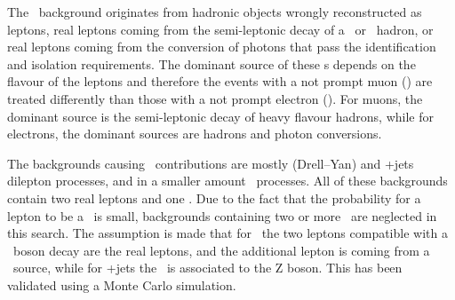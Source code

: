 The \NPL\ background originates from hadronic objects wrongly reconstructed as leptons, real leptons coming from the semi-leptonic decay of a \Pbottom\ or \Pcharm\ hadron, or real leptons coming from the conversion of photons that pass the identification and isolation requirements. The dominant source of these \NPL s depends on the flavour of the leptons and therefore the events with a not prompt muon (\NPM) are treated differently than those with a not prompt electron (\NPE). For muons, the dominant source is the semi-leptonic decay of heavy flavour hadrons, while for electrons, the dominant sources are hadrons and photon conversions. 

The backgrounds causing \NPL\ contributions are mostly \DY (Drell--Yan) and \ttbar+jets dilepton processes, and in a smaller amount \WW\ processes. All of these backgrounds contain two real leptons and one \NPL. Due to the fact that the probability for a lepton to be a \NPL\ is small, backgrounds containing two or more \NPL\  are neglected in this search. The assumption is made that for \DY\ the two leptons compatible with a \PZ\ boson decay are the real leptons, and the additional lepton is coming from a \NPL\ source, while for \ttbar+jets the \NPL\ is associated to the Z boson. This has been validated using a Monte Carlo simulation.

